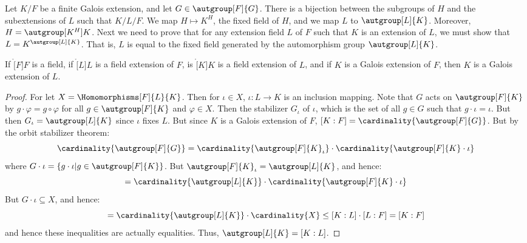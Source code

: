     Let $K/F$ be a finite Galois extension, and let $G\in\autgroup[F]{G}$.
    There is a bijection between the subgroups of $H$ and the subextensions
    of $L$ such that $K/L/F$. We map $H\mapsto{K}^{H}$, the fixed field
    of $H$, and we map $L$ to $\autgroup[L]{K}$. Moreover,
    $H=\autgroup[K^{H}]{K}$. Next we need to prove that for any extension
    field $L$ of $F$ such that $K$ is an extension of $L$, we must show
    that $L=K^{\autgroup[L]{K}}$. That is, $L$ is equal to the fixed field
    generated by the automorphism group $\autgroup[L]{K}$.
    \begin{theorem}
        If $\ring[F]{F}$ is a field, if $\ring[L]{L}$ is a field
        extension of $F$, is $\ring[K]{K}$ is a field extension of $L$,
        and if $K$ is a Galois extension of $F$, then $K$ is a Galois
        extension of $L$.
    \end{theorem}
    \begin{proof}
        For let $X=\Homomorphisms[F]{L}{K}$. Then for $\iota\in{X}$,
        $\iota:L\rightarrow{K}$ is an inclusion mapping. Note that
        $G$ acts on $\autgroup[F]{K}$ by $g\cdot\varphi=g\circ\varphi$
        for all $g\in\autgroup[F]{K}$ and $\varphi\in{X}$. Then the
        stabilizer $G_{\iota}$ of $\iota$, which is the set of all
        $g\in{G}$ such that $g\cdot\iota=\iota$. But then
        $G_{\iota}=\autgroup[L]{K}$ since $\iota$ fixes $L$. But since $K$
        is a Galois extension of $F$,
        $[K:F]=\cardinality{\autgroup[F]{G}}$. But by the orbit stabilizer
        theorem:
        \begin{equation}
            \cardinality{\autgroup[F]{G}}
            =\cardinality{\autgroup[F]{K}_{\iota}}\cdot
                \cardinality{\autgroup[F]{K}\cdot\iota}
        \end{equation}
        where $G\cdot\iota=\{g\cdot\iota|g\in\autgroup[F]{K}\}$. But
        $\autgroup[F]{K}_{\iota}=\autgroup[L]{K}$, and hence:
        \begin{equation}
            [K:F]=\cardinality{\autgroup[L]{K}}\cdot
                \cardinality{\autgroup[F]{K}\cdot\iota}
        \end{equation}
        But $G\cdot\iota\subseteq{X}$, and hence:
        \begin{equation}
            [K:F]=\cardinality{\autgroup[L]{K}}\cdot\cardinality{X}
            \leq[K:L]\cdot[L:F]=[K:F]
        \end{equation}
        and hence these inequalities are actually equalities. Thus,
        $\autgroup[L]{K}=[K:L]$.
    \end{proof}
